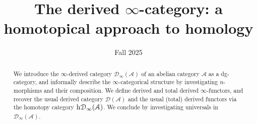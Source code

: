 \documentclass[11pt, letterpaper]{article}
\title{The derived $\infty $-category: a homotopical approach to homology}
\date{Fall 2025}
\begin{document}
\maketitle

\begin{abstract}
	We introduce the $\infty $-derived category $\mathcal{D}_\infty(\mathcal{A} )$ of an abelian category $\mathcal{A} $ as a dg-category, and informally describe the $\infty $-categorical structure by investigating $n$-morphisms and their composition. We define derived and total derived $\infty $-functors, and recover the usual derived category $\mathcal{D} (\mathcal{A} )$ and the usual (total) derived functors via the homotopy category $\mathrm{h} \mathcal{D} _\infty (\mathcal{A} )$. We conclude by investigating universals in $\mathcal{D} _\infty (\mathcal{A} )$. \cite{weibel}
\end{abstract}


\tableofcontents

\newpage






\end{document}
